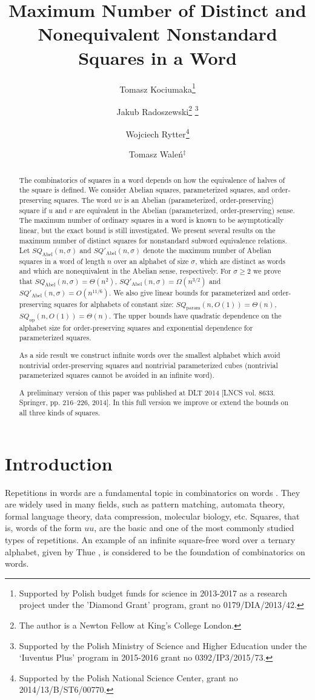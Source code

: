\documentclass{article}
\title{Maximum Number of Distinct and Nonequivalent Nonstandard Squares in a Word}
\author{Tomasz Kociumaka\footnote{Supported by Polish budget funds for science in 2013-2017 as a research project under the 'Diamond Grant' program,
  grant no 0179/DIA/2013/42.}}
\author{Jakub Radoszewski\footnote{The author is a Newton Fellow at King's College London.} \footnote{Supported by the Polish Ministry of Science and Higher Education under the `Iuventus Plus' program in 2015-2016 grant no 0392/IP3/2015/73.}}
\author{Wojciech Rytter\footnote{Supported by the Polish National Science Center, grant no 2014/13/B/ST6/00770.}}
\author{Tomasz Waleń$^\ddagger$}
\affil{Institute of Informatics, University of Warsaw\\
\texttt{[kociumaka,jrad,rytter,walen]@mimuw.edu.pl}}
\date{}
\theoremstyle{plain}
\theoremstyle{definition}
\theoremstyle{remark}
\newcommand{\SQ}{\mathit{SQ}}
\newcommand{\SQABEL}{\SQ_{\mathrm{Abel}}}
\newcommand{\SQPABEL}{\SQ'_{\mathrm{Abel}}}
\newcommand{\SQPARAM}{\SQ_{\mathrm{param}}}
\newcommand{\SQOP}{\SQ_{\mathrm{op}}}
\begin{document}
\maketitle


\begin{abstract}
  The combinatorics of squares in a word depends on how the equivalence of halves of the square is defined.
  We consider Abelian squares, parameterized squares, and order-preserving squares.
  The word $uv$ is an Abelian (parameterized, order-preserving) square if $u$ and $v$ are
  equivalent in the Abelian (parameterized, order-preserving) sense.
  The maximum number of ordinary squares in a word is known to be
  asymptotically linear, but the exact bound is still investigated.
  We present several results on the maximum number of distinct squares
  for nonstandard subword equivalence relations.
  Let $\SQABEL(n,\sigma)$ and $\SQPABEL(n,\sigma)$ denote the maximum number of Abelian
  squares in a word of length $n$ over an alphabet of size $\sigma$,
  which are distinct as words and which are nonequivalent in the Abelian sense, respectively.
  For $\sigma\ge 2$ we prove that $\SQABEL(n,\sigma)=\Theta(n^2)$, $\SQPABEL(n,\sigma)=\Omega(n^{3/2})$
  and $\SQPABEL(n,\sigma) = O(n^{11/6})$.
  We also give linear bounds for parameterized and order-preserving squares
  for alphabets of constant size: $\SQPARAM(n,O(1))=\Theta(n)$, $\SQOP(n,O(1))=\Theta(n)$.
  The upper bounds have quadratic dependence on the alphabet size for order-preserving
  squares and exponential dependence for parameterized squares. 
  
  As a side result we construct infinite words over the smallest alphabet
  which avoid nontrivial order-preserving squares and nontrivial parameterized cubes
  (nontrivial parameterized squares cannot be avoided in an infinite word).

  A preliminary version of this paper was published at DLT 2014 [LNCS vol. 8633. Springer, pp. 216--226, 2014].
  In this full version we improve or extend the bounds on all three kinds of squares.
\end{abstract}


\section{Introduction}
  Repetitions in words are a fundamental topic in combinatorics on words \cite{Karhumaki}.
  They are widely used in many fields, such as pattern matching, automata theory,
  formal language theory, data compression, molecular biology, etc.
  Squares, that is, words of the form $uu$, are the basic and one of the most commonly studied types of repetitions.
  An example of an infinite square-free word over a ternary alphabet, given by Thue \cite{Thue},
  is considered to be the foundation of combinatorics on words.
\end{document}
